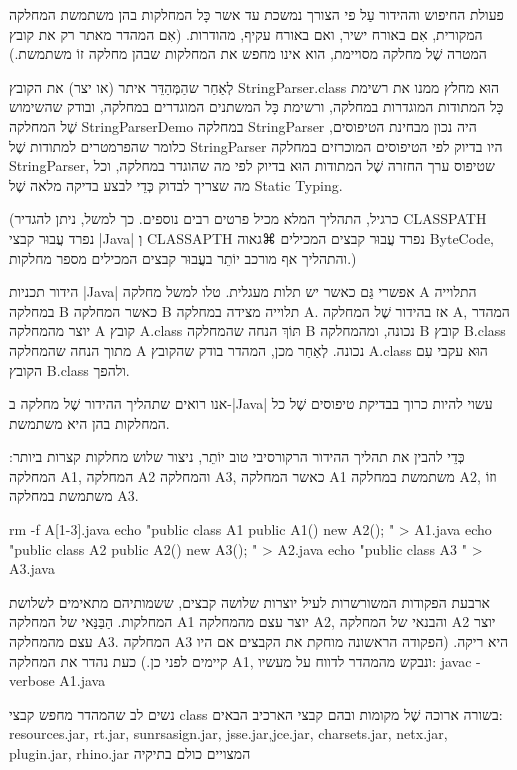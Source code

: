 פעולת החיפוש וההידור עַל פי הצורך נמשכת עד אשר כָּל המחלקות בהן משתמשת
המחלקה המקורית, אִם באורח ישיר, ואם באורח עקיף, מהודרות. (אִם המהדר מאתר
רק את קובץ המטרה שֶׁל מחלקה מסויימת, הוא אינו מחפש את המחלקות
שבהן מחלקה זוֹ משתמשת.)

לְאַחַר שהַמְּהַדֵּר איתר (או יצר) את הקובץ StringParser.class הוּא מחלץ
ממנו את רשימת כָּל המתודות המוגדרות במחלקה, ורשימת כָּל המשתנים המוגדרים
במחלקה, ובודק שהשימוש שֶׁל המחלקה StringParserDemo במחלקה StringParser היה
נכון מבחינת הטיפוסים, כלומר שהפרמטרים למתודות שֶׁל StringParser היו בדיוק לפי
הטיפוסים המוכרזים במחלקה StringParser, שטיפוס ערך החזרה שֶׁל המתודות הוּא בדיוק
לפי מה שהוגדר במחלקה, וכל מה שצריך לבדוק כְּדֵי לבצע בדיקה מלאה שֶׁל Static
Typing.

(כרגיל, התהליך המלא מכיל פרטים רבים נוספים. כך למשל, ניתן להגדיר CLASSPATH
נפרד עֲבוּר קבצי \E|Java| וְ CLASSAPTH נפרד עֲבוּר קבצים המכילים ⌘גאוה ByteCode,
והתהליך אף מורכב יוֹתֵר בעֲבוּר קבצים המכילים מספר מחלקות.)

הידור תכניות \E|Java| אפשרי גַּם כאשר יש תלות מעגלית. טלו למשל מחלקה A
התלוייה במחלקה B כאשר המחלקה B תלוייה מצידה במחלקה A. אז בהידור שֶׁל
המחלקה A, המהדר יוצר מהמחלקה A קובץ A.class תּוֹךְ הנחה שהמחלקה B
נכונה, ומהמחלקה B קובץ B.class מתוך הנחה שהמחלקה A נכונה. לְאַחַר מכן,
המהדר בודק שהקובץ A.class הוּא עקבי עִם הקובץ B.class ולהפך.

אנו רואים שתהליך ההידור שֶׁל מחלקה ב-|Java| עשוי להיות כרוך בבדיקת טיפוסים
שֶׁל כל המחלקות בהן היא משתמשת.

כְּדֵי להבין את תהליך ההידור הרקורסיבי טוב יוֹתֵר, ניצור שלוש מחלקות קצרות
ביותר: המחלקה A1, המחלקה A2 והמחלקה A3, כאשר המחלקה A1 משתמשת
במחלקה A2, וזוֹ משתמשת במחלקה A3.

rm -f A[1-3].java
echo "public class A1 { public A1() { new A2(); }}" > A1.java
echo "public class A2 { public A2() { new A3(); }}" > A2.java
echo "public class A3 { }" > A3.java
\END

ארבעת הפקודות המשורשרות לעיל יוצרות שלושה קבצים, ששמותיהם מתאימים לשלושת
המחלקות. הַבַּנַּאי של המחלקה A1 יוצר עצם מהמחלקה A2, והבנאי של
המחלקה A2 יוצר עצם מהמחלקה A3. המחלקה A3 היא ריקה. (הפקודה הראשונה
מוחקת את הקבצים אם היו קיימים לפני כן.)
כעת נהדר את המחלקה A1, ונבקש מהמהדר לדווח על מעשיו:
javac -verbose A1.java
\END

נשים לב שהמהדר מחפש קבצי class בשורה ארוכה שֶׁל מקומות ובהם קבצי הארכיב הבאים:
resources.jar, rt.jar, sunrsasign.jar, jsse.jar,jce.jar, charsets.jar, netx.jar,
plugin.jar, rhino.jar המצויים כולם בתיקיה

